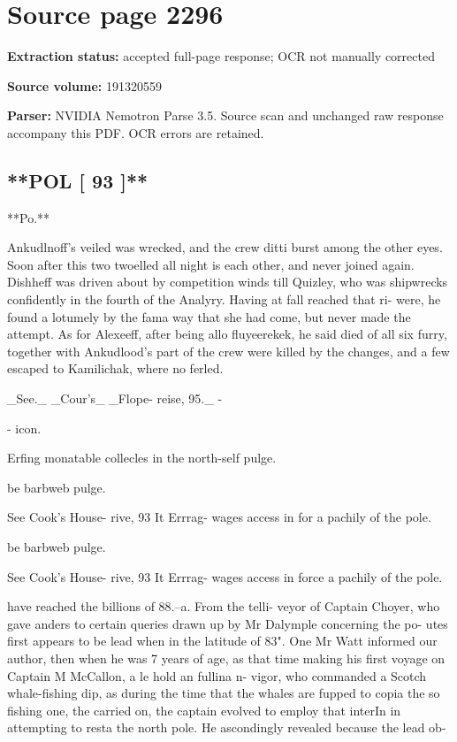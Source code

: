 \clearpage
\section{Source page 2296}
\textbf{Extraction status:} accepted full-page response; OCR not manually corrected\par
\textbf{Source volume:} 191320559\par
\textbf{Parser:} NVIDIA Nemotron Parse 3.5. Source scan and unchanged raw response accompany this PDF. OCR errors are retained.\par\medskip
\subsection*{**POL [ 93 ]**}
**Po.**\par\medskip
Ankudlnoff's veiled was wrecked, and the crew ditti burst among the other eyes. Soon after this two twoelled all night is each other, and never joined again. Dishheff was driven about by competition winds till Quizley, who was shipwrecks confidently in the fourth of the Analyry. Having at fall reached that ri- were, he found a lotumely by the fama way that she had come, but never made the attempt. As for Alexeeff, after being allo fluyeerekek, he said died of all six furry, together with Ankudlood’s part of the crew were killed by the changes, and a few escaped to Kamilichak, where no ferled.\par\medskip
\_See.\_ \_Cour’s\_ \_Flope- reise, 95.\_ -\par\medskip
- icon.\par{}
Erfing
monatable
collecles
in the
north-self
pulge.\par{}
be
barbweb
pulge.\par\medskip
See
Cook's
House-
rive, 93
It
Errrag-
wages
access in
for
a pachily
of
the pole.\par{}
be
barbweb
pulge.\par\medskip
See
Cook's
House-
rive, 93
It
Errrag-
wages
access
in
force
a pachily
of
the pole.\par\medskip
have reached the billions of 88.--a. From the telli-
veyor of Captain Choyer, who gave anders to certain
queries drawn up by Mr Dalymple concerning the po-
utes first appears to be lead when in the latitude of 83". One Mr Watt informed our author, then when he was 7 years of age, as that time making his first voyage on Captain M McCallon, a le hold an fullina n-
vigor, who commanded a Scotch whale-fishing dip, as during the time that the whales are fupped to copia the so fishing one, the carried on, the captain evolved to employ that interIn in attempting to resta the north pole. He ascondingly revealed because the lead ob-

